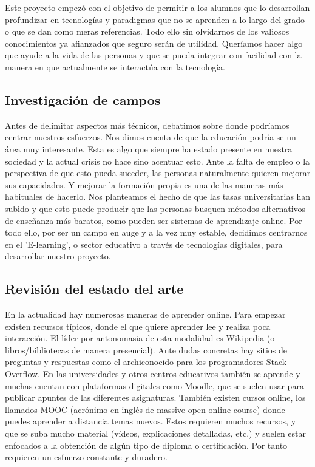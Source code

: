 
Este proyecto empezó con el objetivo de permitir a los alumnos que lo desarrollan profundizar en tecnologías y paradigmas que no se aprenden a lo largo del grado o que se dan como meras referencias. Todo ello sin olvidarnos de los valiosos conocimientos ya afianzados que seguro serán de utilidad. Queríamos hacer algo que ayude a la vida de las personas y que se pueda integrar con facilidad con la manera en que actualmente se interactúa con la tecnología.

\subsection{Investigación de campos\label{subsec:introduction}}

Antes de delimitar aspectos más técnicos, debatimos sobre donde podríamos centrar nuestros esfuerzos. Nos dimos cuenta de que la educación podría se un área muy interesante. Esta es algo que siempre ha estado presente en nuestra sociedad y la actual crisis no hace sino acentuar esto. Ante la falta de empleo o la perspectiva de que esto pueda suceder, las personas naturalmente quieren mejorar sus capacidades. Y mejorar la formación propia es una de las maneras más habituales de hacerlo. Nos planteamos el hecho de que las tasas universitarias han subido y que esto puede producir que las personas busquen métodos alternativos de enseñanza más baratos, como pueden ser sistemas de aprendizaje online. Por todo ello, por ser un campo en auge y a la vez muy estable, decidimos centrarnos en el 'E-learning', o sector educativo a través de tecnologías digitales, para desarrollar nuestro proyecto.

\subsection{Revisión del estado del arte\label{subsec:introduction}}

En la actualidad hay numerosas maneras de aprender online. Para empezar existen recursos típicos, donde el que quiere aprender lee y realiza poca interacción. El líder por antonomasia de esta modalidad es Wikipedia\cite{wiki} (o libros/bibliotecas de manera presencial). Ante dudas concretas hay sitios de preguntas y respuestas como el archiconocido para los programadores Stack Overflow\cite{stack}. En las universidades y otros centros educativos también se aprende y  muchas cuentan con plataformas digitales como Moodle\cite{moodle}, que se suelen usar para publicar apuntes de las diferentes asignaturas. También existen cursos online, los llamados MOOC (acrónimo en inglés de massive open online course) donde puedes aprender a distancia temas nuevos. Estos requieren muchos recursos, y que se suba mucho material (vídeos, explicaciones detalladas, etc.) y suelen estar enfocados a la obtención de algún tipo de diploma o certificación. Por tanto requieren un esfuerzo constante y duradero. 

